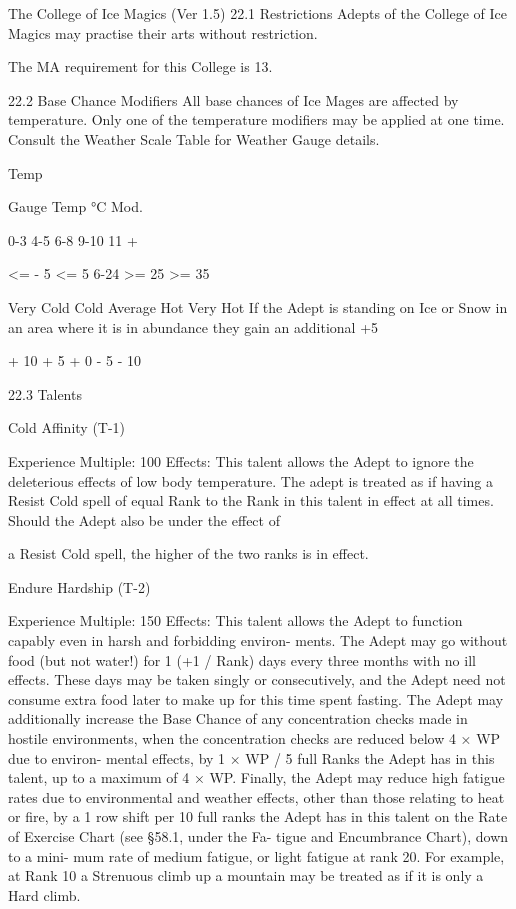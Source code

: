 \begin{Chapter}{The College of Ice Magics (Ver 1.5)}
22.1 Restrictions 
Adepts  of  the  College  of  Ice  Magics  may  practise 
their arts without restriction. 

The MA requirement for this College is 13. 

22.2 Base Chance Modifiers 
All  base  chances  of  Ice  Mages  are  affected  by 
temperature. Only one of the temperature modifiers 
may  be  applied  at  one  time.  Consult  the  Weather 
Scale Table for Weather Gauge details. 

Temp 

Gauge  Temp °C  Mod. 

0-3 
4-5 
6-8 
9-10 
11 + 

<= - 5 
<= 5 
6-24 
>= 25 
>= 35 

Very Cold 
Cold 
Average 
Hot 
Very Hot 
If the Adept is standing on  Ice or Snow in an area 
where  it  is  in  abundance  they  gain  an  additional 
+5%

+ 10 
+ 5 
+ 0 
- 5 
- 10 

22.3 Talents  

Cold Affinity (T-1) 

Experience Multiple: 100 
Effects:  This  talent allows  the  Adept  to  ignore  the 
deleterious  effects  of  low  body  temperature.  The 
adept  is  treated  as  if having a Resist Cold  spell  of 
equal Rank to the Rank in this talent in effect at all 
times. Should the Adept also be under the effect of 

a Resist Cold spell, the higher of the two ranks is in 
effect. 

Endure Hardship (T-2) 

Experience Multiple: 150 
Effects:  This  talent  allows  the  Adept  to  function 
capably  even  in  harsh  and  forbidding  environ-
ments.  The  Adept  may  go  without  food  (but  not 
water!) for 1 (+1 / Rank) days  every three months 
with no ill effects. These days may be taken singly 
or consecutively, and the Adept need not consume 
extra  food  later  to  make  up  for  this  time  spent 
fasting.  The  Adept  may  additionally  increase  the 
Base Chance of any concentration checks made in 
hostile  environments,  when 
the  concentration 
checks are reduced below 4 × WP due to environ-
mental effects, by 1 × WP / 5 full Ranks the Adept 
has  in  this  talent,  up  to  a  maximum  of  4  ×  WP. 
Finally,  the  Adept  may  reduce  high  fatigue  rates 
due  to  environmental  and  weather  effects,  other 
than those relating to heat or fire, by a 1 row shift 
per 10 full ranks the Adept has in this talent on the 
Rate  of  Exercise  Chart  (see  §58.1,  under  the  Fa-
tigue  and  Encumbrance  Chart),  down  to  a  mini-
mum  rate  of  medium  fatigue,  or  light  fatigue  at 
rank  20.  For  example,  at  Rank  10  a  Strenuous 
climb up a mountain may be treated as if it is only 
a Hard climb. 


\end{Chapter}
